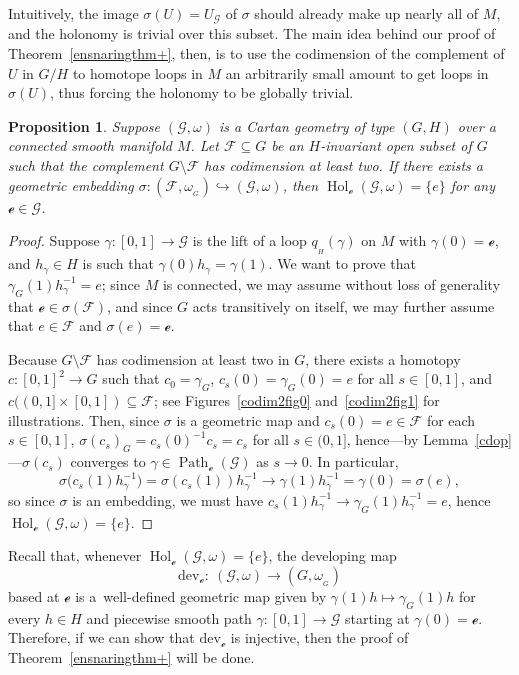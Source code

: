 \documentclass[pdftex]{sigma}
\numberwithin{equation}{section}
\newtheorem{Proposition}[Theorem]{Proposition}
\theoremstyle{definition}
\DeclareMathOperator{\Hol}{\mathrm{Hol}}
\DeclareMathOperator{\Path}{Path}
\newcommand{\MC}[1]{\omega_{{}_{#1}}}
\begin{document}
Intuitively, the image $\sigma(U)=U_\mathscr{G}$ of $\sigma$ should already make up nearly all of $M$, and the holonomy is trivial over this subset. The main idea behind our proof of Theorem~\ref{ensnaringthm+}, then, is to use the codimension of the complement of $U$ in $G/H$ to homotope loops in $M$ an arbitrarily small amount to get loops in $\sigma(U)$, thus forcing the holonomy to be globally trivial.

\begin{Proposition}\label{codim2}
Suppose $(\mathscr{G},\omega)$ is a Cartan geometry of type $(G,H)$ over a connected smooth manifold $M$. Let $\mathscr{F}\subseteq G$ be an $H$-invariant open subset of $G$ such that the complement $G\setminus\mathscr{F}$ has codimension at least two. If there exists a geometric embedding $\sigma\colon (\mathscr{F},\MC{G})\hookrightarrow (\mathscr{G},\omega)$, then $\Hol_\mathscr{e}(\mathscr{G},\omega)=\{e\}$ for any $\mathscr{e}\in\mathscr{G}$.
\end{Proposition}
\begin{proof}Suppose $\gamma \colon [0,1]\to\mathscr{G}$ is the lift of a loop $q_{{}_H}(\gamma)$ on $M$ with $\gamma(0)=\mathscr{e}$, and $h_\gamma\in H$ is such that $\gamma(0)h_\gamma=\gamma(1)$. We want to prove that $\gamma_G(1)h_\gamma^{-1}=e$; since $M$ is connected, we may assume without loss of generality that $\mathscr{e}\in\sigma(\mathscr{F})$, and since $G$ acts transitively on itself, we may further assume that $e\in\mathscr{F}$ and $\sigma(e)=\mathscr{e}$.

Because $G\setminus\mathscr{F}$ has codimension at least two in $G$, there exists a homotopy $c\colon [0,1]^2\to G$ such that $c_0=\gamma_G$, $c_s(0)=\gamma_G(0)=e$ for all $s\in[0,1]$, and $c((0,1]\times[0,1])\subseteq\mathscr{F}$; see Figures~\ref{codim2fig0} and~\ref{codim2fig1} for illustrations. Then, since $\sigma$ is a geometric map and $c_s(0)=e\in\mathscr{F}$ for each $s\in[0,1]$, $\sigma(c_s)_G=c_s(0)^{-1}c_s=c_s$ for all $s\in (0,1]$, hence---by Lemma~\ref{cdop}---$\sigma(c_s)$ converges to $\gamma\in\Path_\mathscr{e}(\mathscr{G})$ as $s\rightarrow 0$. In particular, \[\sigma\bigl(c_s(1)h_\gamma^{-1}\bigr)=\sigma(c_s(1))h_\gamma^{-1}\rightarrow\gamma(1)h_\gamma^{-1}=\gamma(0)=\sigma(e),\] so since $\sigma$ is an embedding, we must have $c_s(1)h_\gamma^{-1}\rightarrow\gamma_G(1)h_\gamma^{-1}=e$, hence $\Hol_\mathscr{e}(\mathscr{G},\omega)=\{e\}$.
\end{proof}

Recall that, whenever $\Hol_\mathscr{e}(\mathscr{G},\omega)=\{e\}$, the developing map \[\mathrm{dev}_\mathscr{e}\colon \ (\mathscr{G},\omega)\to(G,\MC{G})\] based at $\mathscr{e}$ is a~well-defined geometric map given by $\gamma(1)h\mapsto\gamma_G(1)h$ for every $h\in H$ and piecewise smooth path $\gamma \colon [0,1]\to\mathscr{G}$ starting at $\gamma(0)=\mathscr{e}$. Therefore, if we can show that $\mathrm{dev}_\mathscr{e}$ is injective, then the proof of Theorem~\ref{ensnaringthm+} will be done.
\end{document}
